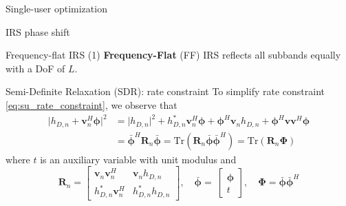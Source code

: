 \documentclass[9pt]{beamer}
\begin{document}
\begin{section}{Single-user optimization}
\begin{subsection}{IRS phase shift}
		\begin{frame}{Frequency-flat IRS (1)}
			\textbf{Frequency-Flat} (FF) IRS reflects all subbands equally with a DoF of $L$.
			\begin{block}{Semi-Definite Relaxation (SDR): rate constraint}
				To simplify rate constraint \ref{eq:su_rate_constraint}, we observe that
				\begin{equation}
					\begin{split}
						\lvert{h_{D,n}+\boldsymbol{v}_n^H\boldsymbol{\phi}}\rvert^2
						&=\lvert{h_{D,n}}\rvert^2+h_{D,n}^*\boldsymbol{v}_n^H\boldsymbol{\phi}+\boldsymbol{\phi}^H\boldsymbol{v}_n{h_{D,n}}+\boldsymbol{\phi}^H\boldsymbol{v}\boldsymbol{v}^H\boldsymbol{\phi}\\
						&=\bar{\boldsymbol{\phi}}^H\boldsymbol{R}_n\bar{\boldsymbol{\phi}}=\mathrm{Tr}(\boldsymbol{R}_n\bar{\boldsymbol{\phi}}\bar{\boldsymbol{\phi}}^H)=\mathrm{Tr}(\boldsymbol{R}_n\boldsymbol{\Phi})
					\end{split}
				\end{equation}
				where $t$ is an auxiliary variable with unit modulus and
				\begin{equation}\label{eq:R_n,phi}
					\boldsymbol{R}_n=
					\begin{bmatrix}
						\boldsymbol{v}_n\boldsymbol{v}_n^H & \boldsymbol{v}_n{h_{D,n}} \\
						h_{D,n}^*{\boldsymbol{v}_n^H}      & h_{D,n}^*{h_{D,n}}
					\end{bmatrix},
					\quad \bar{\boldsymbol{\phi}}=\
					\begin{bmatrix}
						\boldsymbol{\phi} \\
						t
					\end{bmatrix},
					\quad \boldsymbol{\Phi}=\bar{\boldsymbol{\phi}}\bar{\boldsymbol{\phi}}^H
				\end{equation}
			\end{block}
		\end{frame}


\end{subsection}
\end{section}
\end{document}
